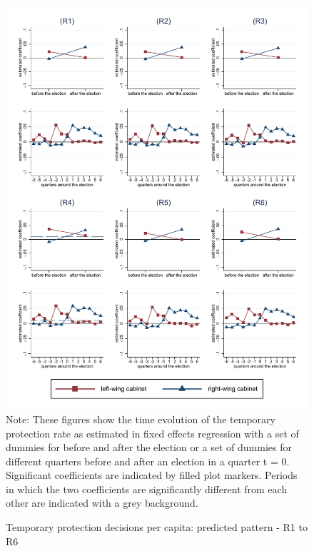 \documentclass[11pt,a4paper]{scrartcl}
\begin{document}
\clearpage
\FloatBarrier
\begin{figure}[!ht]
	\caption{Temporary protection decisions per capita: predicted pattern - R1 to R6}
	\includegraphics[width=1\textwidth]{../results/decisions/temporary_protection_rate_graphs_R1-R6.pdf}
	\scriptsize{Note: These figures show the time evolution of the temporary protection rate as estimated in fixed effects regression with a set of dummies for before and after the election or a set of dummies for different quarters before and after an election in a quarter t = 0. Significant coefficients are indicated by filled plot markers. Periods in which the two coefficients are significantly different from each other are indicated with a grey background.}
\end{figure}

\clearpage
\FloatBarrier


\end{document}
